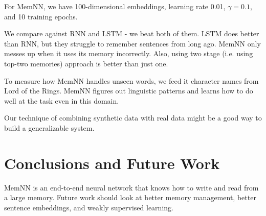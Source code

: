 \documentclass[a4paper]{article}
\begin{document}
For MemNN, we have 100-dimensional embeddings, learning rate 0.01,
$\gamma = 0.1$, and 10 training epochs.

We compare against RNN and LSTM - we beat both of them. LSTM does better
than RNN, but they struggle to remember sentences from long ago. MemNN
only messes up when it uses its memory incorrectly. Also, using two
stage (i.e. using top-two memories) approach is better than just one.

To measure how MemNN handles unseen words, we feed it character names from
Lord of the Rings. MemNN figures out linguistic patterns and learns how to
do well at the task even in this domain.

Our technique of combining synthetic data with real data might be a good
way to build a generalizable system.

\section{Conclusions and Future Work}
MemNN is an end-to-end neural network that knows how to write and read
from a large memory. Future work should look at better memory management,
better sentence embeddings, and weakly supervised learning.
\end{document}
